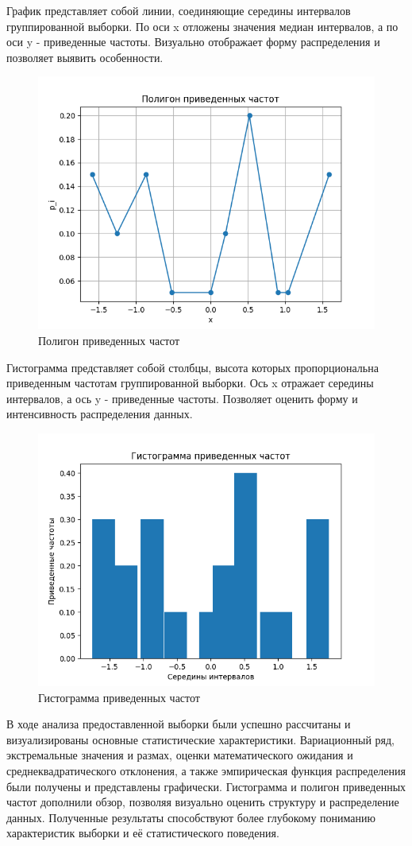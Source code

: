\documentclass[14pt]{extreport}
\begin{document}
            График представляет собой линии, соединяющие середины интервалов группированной выборки. По оси x отложены значения медиан интервалов, а по оси y - приведенные частоты. Визуально отображает форму распределения и позволяет выявить особенности.
            \begin{figure}[h]
                \centering
                \includegraphics[width=0.3\linewidth]{graph2.png}
                \caption{Полигон приведенных частот }
            \end{figure}

            Гистограмма представляет собой столбцы, высота которых пропорциональна приведенным частотам группированной выборки. Ось x отражает середины интервалов, а ось y - приведенные частоты. Позволяет оценить форму и интенсивность распределения данных.
            \begin{figure}[h]
                \centering
                \includegraphics[width=0.3\linewidth]{graph3.png}
                \caption{Гистограмма приведенных частот }
            \end{figure}
    \conclusions В ходе анализа предоставленной выборки были успешно рассчитаны и визуализированы основные статистические характеристики. Вариационный ряд, экстремальные значения и размах, оценки математического ожидания и среднеквадратического отклонения, а также эмпирическая функция распределения были получены и представлены графически. Гистограмма и полигон приведенных частот дополнили обзор, позволяя визуально оценить структуру и распределение данных. Полученные результаты способствуют более глубокому пониманию характеристик выборки и её статистического поведения.
\end{document}

